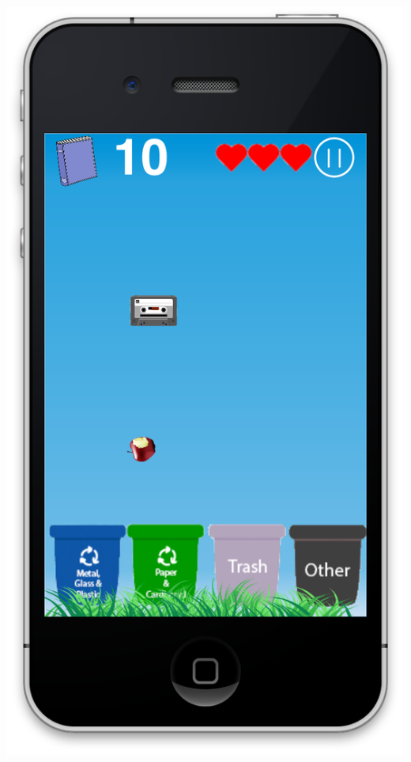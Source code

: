 \documentclass[11pt]{article}
\begin{document}
\includegraphics[scale=0.3]{gameplay1}
\end{document}
